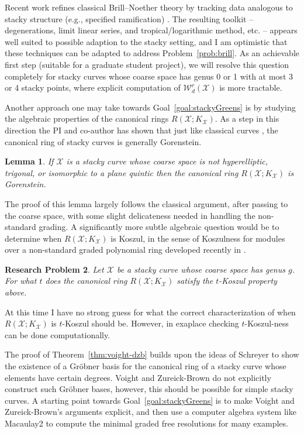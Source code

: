\documentclass[11pt,reqno]{amsart}
\newtheorem{lemma}{Lemma}[section]
\newtheorem{problem}[lemma]{Research Problem}
\theoremstyle{remark}
\newcommand{\cW}{\mathcal{W}}
\newcommand{\cX}{\mathcal{X}}
\begin{document}
Recent work refines classical Brill–Noether theory by tracking data analogous to stacky structure (e.g., specified ramification) \cite{p17,larson21,larson21-2,JR21,CPJ22,CPJ22-2,LLV25}. The resulting toolkit -- degenerations, limit linear series, and tropical/logarithmic method, etc. -- appears well suited to possible adaption to the stacky setting, and I am optimistic that these techniques can be adapted to address Problem~\ref{prob:brill}. As an achievable first step (suitable for a graduate student project), we will resolve this question completely for stacky curves whose coarse space has genus 0 or 1 with at most 3 or 4 stacky points, where explicit computation of $\cW_{d}^{r}(\cX)$ is more tractable. 

Another approach one may take towards Goal~\ref{goal:stackyGreens} is by studying the algebraic properties of the canonical rings $R(\cX;K_{\cX})$. As a step in this direction the PI and co-author has shown that just like classical curves \cite{VF93,PP97}, the canonical ring of stacky curves is generally Gorenstein.  

\begin{lemma}
	If $\cX$ is a stacky curve whose coarse space is not hyperelliptic, trigonal, or isomorphic to a plane quintic then the canonical ring $R(\cX;K_{\cX})$ is Gorenstein. 
\end{lemma}

The proof of this lemma largely follows the classical argument, after passing to the coarse space, with some slight delicateness needed in handling the non-standard grading. A significantly more subtle algebraic question would be to determine when $R(\cX; K_{\cX})$ is Koszul, in the sense of Koszulness for modules over a non-standard graded polynomial ring developed recently in \cite{DB25}. 

\begin{problem}
	Let $\cX$ be a stacky curve whose coarse space has genus $g$. For what $t$ does the canonical ring $R(\cX;K_{\cX})$ satisfy the $t$-Koszul property above.  
\end{problem}

At this time I have no strong guess for what the correct characterization of when $R(\cX;K_{\cX})$ is $t$-Koszul should be. However, in exaplace checking $t$-Koszul-ness can be done computationally.

The proof of Theorem~\ref{thm:voight-dzb} builds upon the ideas of Schreyer \cite{schreyer91} to show the existence of a Gr\"{o}bner basis for the canonical ring of a stacky curve whose elements have certain degrees. Voight and Zureick-Brown do not explicitly construct such Gr\"{o}bner bases, however, this should be possible for simple stacky curves.  A starting point towards Goal~\ref{goal:stackyGreens} is to make Voight and Zureick-Brown's arguments explicit, and then use a computer algebra system like Macaulay2 to compute the minimal graded free resolutions for many examples.  
\end{document}
